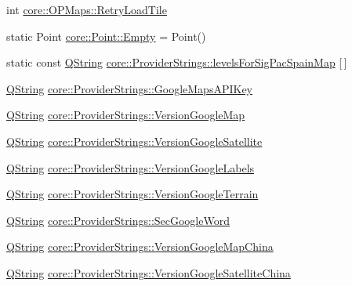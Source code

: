 \begin{DoxyCompactItemize}
\item 
int \hyperlink{group___o_p_map_widget_ga21cb35ff34ca1e5eccfe7a0c8f054933}{core\-::\-O\-P\-Maps\-::\-Retry\-Load\-Tile}
\item 
static \-Point \hyperlink{group___o_p_map_widget_ga8f0f8df337a57e048e21c0410bd1a7e3}{core\-::\-Point\-::\-Empty} = \-Point()
\item 
static const \hyperlink{group___u_a_v_objects_plugin_gab9d252f49c333c94a72f97ce3105a32d}{\-Q\-String} \hyperlink{group___o_p_map_widget_ga8e0c0e07bd5f4a133451306c0603f393}{core\-::\-Provider\-Strings\-::levels\-For\-Sig\-Pac\-Spain\-Map} \mbox{[}$\,$\mbox{]}
\item 
\hyperlink{group___u_a_v_objects_plugin_gab9d252f49c333c94a72f97ce3105a32d}{\-Q\-String} \hyperlink{group___o_p_map_widget_ga4a655ecac5457e2a580ee2c9b7743441}{core\-::\-Provider\-Strings\-::\-Google\-Maps\-A\-P\-I\-Key}
\item 
\hyperlink{group___u_a_v_objects_plugin_gab9d252f49c333c94a72f97ce3105a32d}{\-Q\-String} \hyperlink{group___o_p_map_widget_ga8c6875ce694aabbd5987f55b816cca2b}{core\-::\-Provider\-Strings\-::\-Version\-Google\-Map}
\item 
\hyperlink{group___u_a_v_objects_plugin_gab9d252f49c333c94a72f97ce3105a32d}{\-Q\-String} \hyperlink{group___o_p_map_widget_gaeca979ef517e8ce202c7ce19d8f0c52f}{core\-::\-Provider\-Strings\-::\-Version\-Google\-Satellite}
\item 
\hyperlink{group___u_a_v_objects_plugin_gab9d252f49c333c94a72f97ce3105a32d}{\-Q\-String} \hyperlink{group___o_p_map_widget_gaa55f03ddecd8e241164698587988c456}{core\-::\-Provider\-Strings\-::\-Version\-Google\-Labels}
\item 
\hyperlink{group___u_a_v_objects_plugin_gab9d252f49c333c94a72f97ce3105a32d}{\-Q\-String} \hyperlink{group___o_p_map_widget_gacab9db5e4f5aff7ca4ea6bc63e1ca876}{core\-::\-Provider\-Strings\-::\-Version\-Google\-Terrain}
\item 
\hyperlink{group___u_a_v_objects_plugin_gab9d252f49c333c94a72f97ce3105a32d}{\-Q\-String} \hyperlink{group___o_p_map_widget_gaa681a15654ccc6246baadb0d3e51e660}{core\-::\-Provider\-Strings\-::\-Sec\-Google\-Word}
\item 
\hyperlink{group___u_a_v_objects_plugin_gab9d252f49c333c94a72f97ce3105a32d}{\-Q\-String} \hyperlink{group___o_p_map_widget_gae854c1eca4887d3d875bc5f26ace02f2}{core\-::\-Provider\-Strings\-::\-Version\-Google\-Map\-China}
\item 
\hyperlink{group___u_a_v_objects_plugin_gab9d252f49c333c94a72f97ce3105a32d}{\-Q\-String} \hyperlink{group___o_p_map_widget_ga9305b4a54fb603c540a9a8c268a097ec}{core\-::\-Provider\-Strings\-::\-Version\-Google\-Satellite\-China}

\end{DoxyCompactItemize}
